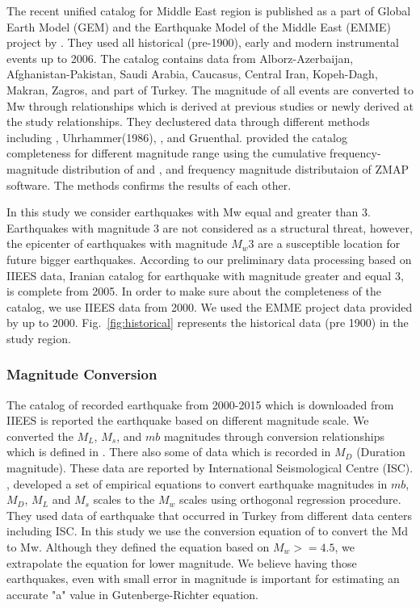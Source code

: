 The recent unified catalog for Middle East region is published as a part of Global Earth Model (GEM) and the Earthquake Model of the Middle East (EMME) project by \citet{Zare2014}. They used all historical (pre-1900), early and modern instrumental events up to 2006. The catalog contains data from Alborz-Azerbaijan, Afghanistan-Pakistan, Saudi Arabia, Caucasus, Central Iran, Kopeh-Dagh, Makran, Zagros, and part of Turkey. The magnitude of all events are converted to Mw through relationships which is derived at previous studies or newly derived at the study relationships. They declustered data through different methods including \citet{Gardner1974}, Uhrhammer(1986), \citet{Reasenberg1985}, and Gruenthal. \citet{Zare2014} provided the catalog completeness for different magnitude range using  the cumulative frequency-magnitude distribution of  \citet{Gutenberg1944} and \citet{richter1958}, and frequency magnitude distributaion of ZMAP \citep{Wiemer2001} software. The methods confirms the results of each other. 

In this study we consider earthquakes with Mw equal and greater than 3. Earthquakes with magnitude 3 are not considered as a structural threat, however, the epicenter of earthquakes with magnitude $M_w 3$ are a  susceptible location for future bigger earthquakes.  According to our preliminary data processing based on IIEES data, Iranian catalog for earthquake with magnitude greater and equal 3, is complete from 2005. In order to make sure about the completeness of the catalog, we use IIEES data from 2000. We used the EMME project data provided by \citet{Zare2014} up to 2000. Fig.~\ref{fig:historical} represents the historical data (pre 1900) in the study region. 

\subsubsection{Magnitude Conversion}

The catalog of recorded earthquake from 2000-2015 which is downloaded from IIEES is reported the earthquake based on different magnitude scale. We converted the $M_L$, $M_s$, and $mb$ magnitudes through conversion relationships which is defined in \citet{Zare2014}. There also some of data which is recorded in $M_D$ (Duration magnitude). These data are reported by International Seismological Centre (ISC).  \citet{Deniz2010}, developed a set of empirical equations to convert earthquake magnitudes in $mb$, $M_D$, $M_L$ and $M_s$ scales to the $M_w$ scales using orthogonal regression procedure. They used data of earthquake that occurred in Turkey from different data centers including ISC. In this study we use the conversion equation of \citet{Deniz2010} to convert the Md to Mw. Although they defined the equation based on $M_w>=4.5$, we extrapolate the equation for lower magnitude. We believe having those earthquakes, even with small error  in magnitude is important for estimating an accurate "a" value  in Gutenberge-Richter equation.

